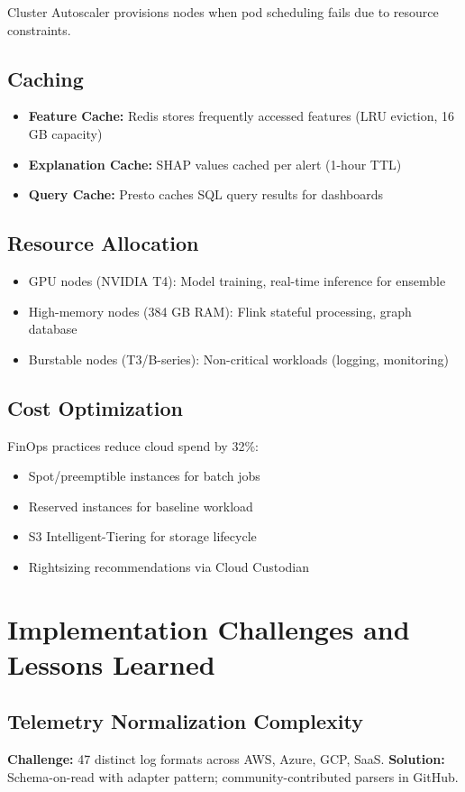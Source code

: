 Cluster Autoscaler provisions nodes when pod scheduling fails due to resource constraints.

\subsection{Caching}
\begin{itemize}
    \item \textbf{Feature Cache:} Redis stores frequently accessed features (LRU eviction, 16 GB capacity)
    \item \textbf{Explanation Cache:} SHAP values cached per alert (1-hour TTL)
    \item \textbf{Query Cache:} Presto caches SQL query results for dashboards
\end{itemize}

\subsection{Resource Allocation}
\begin{itemize}
    \item GPU nodes (NVIDIA T4): Model training, real-time inference for ensemble
    \item High-memory nodes (384 GB RAM): Flink stateful processing, graph database
    \item Burstable nodes (T3/B-series): Non-critical workloads (logging, monitoring)
\end{itemize}

\subsection{Cost Optimization}
FinOps practices reduce cloud spend by 32\%:
\begin{itemize}
    \item Spot/preemptible instances for batch jobs
    \item Reserved instances for baseline workload
    \item S3 Intelligent-Tiering for storage lifecycle
    \item Rightsizing recommendations via Cloud Custodian
\end{itemize}

\section{Implementation Challenges and Lessons Learned}\label{sec:arch-challenges}
\subsection{Telemetry Normalization Complexity}
\textbf{Challenge:} 47 distinct log formats across AWS, Azure, GCP, SaaS.
\textbf{Solution:} Schema-on-read with adapter pattern; community-contributed parsers in GitHub.

